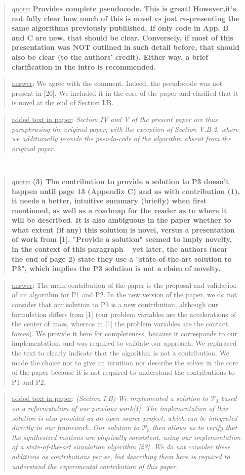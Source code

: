\documentclass[a4paper]{article}
\newcommand{\done}[0]{}
\newcommand\quot[1]{\begin{quote} \underline{quote}: \textbf{#1}\end{quote}}
\newcommand\as[1]{\begin{quote} \underline{answer}: {#1}\end{quote} }
\newcommand\qt[1]{\begin{quote} \underline{added text in paper}: \textit{#1}\end{quote} \leavevmode \\ }
\begin{document}
\quot{
Provides complete pseudocode.  This is great! However,it's
not fully clear how much of this is novel vs just re-presenting the
same algorithms previously publilshed.	If only code in App. B and C
are new, that should be clear. Conversely, if most of this presentation
was NOT outlined in such detail before, that should also be clear (to
the authors' credit). Either way, a brief clarification in the intro is
recommended.}

\as{We agree with the comment. Indeed, the pseudocode was not present in [20]. We included it in the core of the paper and clarified that it is novel at the end
of Section I.B.}
\qt{Section IV and V of the present paper are thus paraphrasing the original paper, with the exception of Section V.B.2, where we additionally provide the pseudo-code of the algorithm absent from the original paper.}
\done


\quot{(3)	The contribution to provide a solution to P3 doesn't happen
until page 13 (Appendix C) and as with contribution (1), it needs a
better, intuitive summary (briefly) when first mentioned, as well as a
roadmap for the reader as to where it will be described. It is also
ambiguous in the paper whether to what extent (if any) this solution is
novel, versus a presentation of work from [1]. "Provide a solution"
seemed to imply novelty, in the context of this paragraph -- yet later,
the authors (near the end of page 2) state they use a "state-of-the-art
solution to P3", which implies the P3 solution is not a claim of
novelty.}

\as{The main contribution of the paper is the proposal and validation of an algorithm for P1 and P2. 
In the new version of the paper, we do not consider that our solution to P3
is a new contribution, although our formulation differs from [1] (our problem variables are the accelerations
of the center of mass, whereas in [1] the problem variables are the contact forces). We provide it here for completeness, because it corresponds to our implementation, and 
was required to validate our approach. 
We rephrased the text to clearly indicate that the algorithm is not a contribution. We made the choice not to give an intuition nor describe the solver in the core
of the paper because it is not required to understand the contributions to P1 and P2.}
\qt{(Section I.B) We implemented a solution to $\mathcal{P}_3$ based on a reformulation of our previous work[1]. The implementation of this solution is also provided as an open-source project, which can be integrated directly in our framework. Our solution to $\mathcal{P}_3$ then allows us to verify that the synthesized motions are physically consistent, using our implementation of a state-of-the-art simulation algorithm [28].
We do not consider these additions as contributions per se, but describing them here is required to understand the experimental contribution of this paper.}\done
\end{document}
